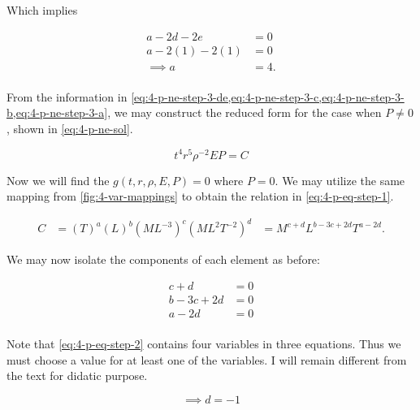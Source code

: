 \documentclass[12pt]{article}
\begin{document}
  Which implies

  \begin{equation}
    \label{eq:4-p-ne-step-3-a}
    \begin{aligned}
      a-2d-2e&=0 \\
      a-2(1)-2(1)&=0 \\
      \implies a&=4. \\
    \end{aligned}
  \end{equation}

  From the information in
  \cref{eq:4-p-ne-step-3-de,eq:4-p-ne-step-3-c,eq:4-p-ne-step-3-b,eq:4-p-ne-step-3-a},
  we may construct the reduced form for the case when $P\ne0$, shown in
  \cref{eq:4-p-ne-sol}.

  \begin{equation}
    \label{eq:4-p-ne-sol}
      \boxed{
        t^4r^5\rho^{-2}EP=C
      }
    \end{equation}

  \newpage
  Now we will find the $g(t,r,\rho,E,P)=0$ where $P=0$. We may utilize the same
  mapping from \cref{fig:4-var-mappings} to obtain the relation in
  \cref{eq:4-p-eq-step-1}.

  \begin{equation}
    \label{eq:4-p-eq-step-1}
    \begin{aligned}
      C &= (T)^a(L)^b(ML^{-3})^c(ML^2T^{-2})^d
      &= M^{c+d}L^{b-3c+2d}T^{a-2d}.
      \end{aligned}
  \end{equation}

  We may now isolate the components of each element as before:

  \begin{equation}
    \label{eq:4-p-eq-step-2}
    \begin{aligned}
      c + d &= 0 \\
      b - 3c + 2d &= 0 \\
      a - 2d &= 0 \\
    \end{aligned}
  \end{equation}

  Note that \cref{eq:4-p-eq-step-2} contains four variables in three equations.
  Thus we must choose a value for at least one of the variables. I will remain
  different from the text for didatic purpose.

  \begin{equation}
    \label{eq:4-p-eq-step-3-d}
    \implies d=-1
  \end{equation}
\end{document}
